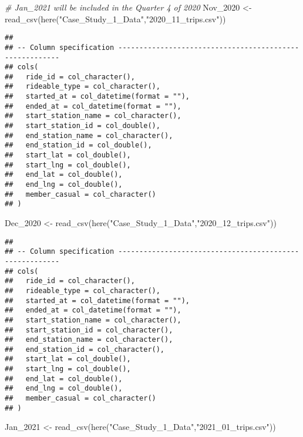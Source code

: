 \documentclass[
]{article}
\newenvironment{Shaded}{\begin{snugshade}}{\end{snugshade}}
\newcommand{\CommentTok}[1]{\textcolor[rgb]{0.56,0.35,0.01}{\textit{#1}}}
\newcommand{\FunctionTok}[1]{\textcolor[rgb]{0.00,0.00,0.00}{#1}}
\newcommand{\NormalTok}[1]{#1}
\newcommand{\OtherTok}[1]{\textcolor[rgb]{0.56,0.35,0.01}{#1}}
\newcommand{\StringTok}[1]{\textcolor[rgb]{0.31,0.60,0.02}{#1}}
\begin{document}
\begin{Shaded}
\begin{Highlighting}[]
\CommentTok{\# Jan\_2021 will be included in the Quarter 4 of 2020 }
\NormalTok{ Nov\_2020 }\OtherTok{\textless{}{-}} \FunctionTok{read\_csv}\NormalTok{(}\FunctionTok{here}\NormalTok{(}\StringTok{"Case\_Study\_1\_Data"}\NormalTok{,}\StringTok{"2020\_11\_trips.csv"}\NormalTok{))}
\end{Highlighting}
\end{Shaded}

\begin{verbatim}
## 
## -- Column specification --------------------------------------------------------
## cols(
##   ride_id = col_character(),
##   rideable_type = col_character(),
##   started_at = col_datetime(format = ""),
##   ended_at = col_datetime(format = ""),
##   start_station_name = col_character(),
##   start_station_id = col_double(),
##   end_station_name = col_character(),
##   end_station_id = col_double(),
##   start_lat = col_double(),
##   start_lng = col_double(),
##   end_lat = col_double(),
##   end_lng = col_double(),
##   member_casual = col_character()
## )
\end{verbatim}

\begin{Shaded}
\begin{Highlighting}[]
\NormalTok{ Dec\_2020 }\OtherTok{\textless{}{-}} \FunctionTok{read\_csv}\NormalTok{(}\FunctionTok{here}\NormalTok{(}\StringTok{"Case\_Study\_1\_Data"}\NormalTok{,}\StringTok{"2020\_12\_trips.csv"}\NormalTok{))}
\end{Highlighting}
\end{Shaded}

\begin{verbatim}
## 
## -- Column specification --------------------------------------------------------
## cols(
##   ride_id = col_character(),
##   rideable_type = col_character(),
##   started_at = col_datetime(format = ""),
##   ended_at = col_datetime(format = ""),
##   start_station_name = col_character(),
##   start_station_id = col_character(),
##   end_station_name = col_character(),
##   end_station_id = col_character(),
##   start_lat = col_double(),
##   start_lng = col_double(),
##   end_lat = col_double(),
##   end_lng = col_double(),
##   member_casual = col_character()
## )
\end{verbatim}

\begin{Shaded}
\begin{Highlighting}[]
\NormalTok{ Jan\_2021 }\OtherTok{\textless{}{-}} \FunctionTok{read\_csv}\NormalTok{(}\FunctionTok{here}\NormalTok{(}\StringTok{"Case\_Study\_1\_Data"}\NormalTok{,}\StringTok{"2021\_01\_trips.csv"}\NormalTok{))}
\end{Highlighting}
\end{Shaded}
\end{document}
